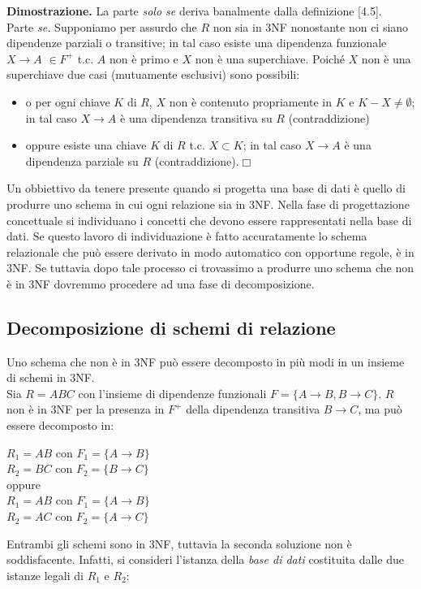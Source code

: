 \textbf{Dimostrazione.} La parte \emph{solo se} deriva banalmente dalla definizione [4.5].\\
Parte \emph{se.} Supponiamo per assurdo che $R$ non sia in 3NF nonostante non ci siano
dipendenze parziali o transitive; in tal caso esiste una dipendenza funzionale $X\rightarrow A$
$\in F^+$ t.c. $A$ non è primo e $X$ non è una superchiave. Poiché $X$ non è una
superchiave due casi (mutuamente esclusivi) sono possibili:
\begin{itemize}
 \item o per ogni chiave $K$ di $R$, $X$ non è contenuto propriamente in $K$ e $K-X \neq 
 \emptyset$; in tal caso $X\rightarrow A$ è una dipendenza transitiva su $R$ (contraddizione)
 \item oppure esiste una chiave $K$ di $R$ t.c. $X \subset K$; in tal caso $X\rightarrow A$ 
 è una dipendenza parziale su $R$ (contraddizione).\hfill $\Box$
\end{itemize}
Un obbiettivo da tenere presente quando si progetta una base di dati è quello di produrre 
uno schema in cui ogni relazione sia in 3NF. Nella fase di progettazione concettuale si 
individuano i concetti che devono essere rappresentati nella base di dati. Se questo lavoro 
di individuazione è fatto accuratamente lo schema relazionale che può essere derivato in modo
automatico con opportune regole, è in 3NF. Se tuttavia dopo tale processo ci trovassimo a 
produrre uno schema che non è in 3NF dovremmo procedere ad una fase di decomposizione.

\subsection{Decomposizione di schemi di relazione}
Uno schema che non è in 3NF può essere decomposto in più modi in un insieme di schemi in 3NF.\\
 Sia $R = ABC$ con l'insieme di dipendenze funzionali $F = \{A\rightarrow B, B\rightarrow C\}$.
$R$ non è in 3NF per la presenza in $F^+$ della dipendenza transitiva $B\rightarrow C$, ma può 
essere decomposto in:
\begin{center}
  $R_1 = AB$ con $F_1=\{A\rightarrow B\}$\\
  $R_2 = BC$ con $F_2=\{B\rightarrow C\}$\\
  oppure\\
  $R_1 = AB$ con $F_1=\{A\rightarrow B\}$\\
  $R_2 = AC$ con $F_2=\{A\rightarrow C\}$\\
\end{center}
Entrambi gli schemi sono in 3NF, tuttavia la seconda soluzione non è soddisfacente. Infatti,
si consideri l'istanza della \emph{base di dati} costituita dalle due istanze legali di $R_1$ e $R_2$:

